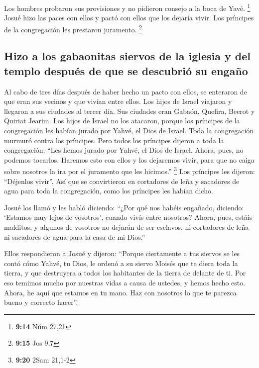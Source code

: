  Los hombres probaron sus provisiones y no pidieron
consejo a la boca de Yavé. \footnote{\textbf{9:14} Núm 27,21}
 Josué hizo las paces con ellos y pactó con ellos que los
dejaría vivir. Los príncipes de la congregación les prestaron juramento.
\footnote{\textbf{9:15} Jos 9,7}

\hypertarget{hizo-a-los-gabaonitas-siervos-de-la-iglesia-y-del-templo-despuuxe9s-de-que-se-descubriuxf3-su-engauxf1o}{%
\subsection{Hizo a los gabaonitas siervos de la iglesia y del templo
después de que se descubrió su
engaño}\label{hizo-a-los-gabaonitas-siervos-de-la-iglesia-y-del-templo-despuuxe9s-de-que-se-descubriuxf3-su-engauxf1o}}

 Al cabo de tres días después de haber hecho un pacto con
ellos, se enteraron de que eran sus vecinos y que vivían entre ellos.
 Los hijos de Israel viajaron y llegaron a sus ciudades
al tercer día. Sus ciudades eran Gabaón, Quefira, Beerot y Quiriat
Jearim.  Los hijos de Israel no los atacaron, porque los
príncipes de la congregación les habían jurado por Yahvé, el Dios de
Israel. Toda la congregación murmuró contra los príncipes.
 Pero todos los príncipes dijeron a toda la congregación:
``Les hemos jurado por Yahvé, el Dios de Israel. Ahora, pues, no podemos
tocarlos.  Haremos esto con ellos y los dejaremos vivir,
para que no caiga sobre nosotros la ira por el juramento que les
hicimos.'' \footnote{\textbf{9:20} 2Sam 21,1-2}  Los
príncipes les dijeron: ``Déjenlos vivir''. Así que se convirtieron en
cortadores de leña y sacadores de agua para toda la congregación, como
los príncipes les habían dicho.

 Josué los llamó y les habló diciendo: ``¿Por qué nos
habéis engañado, diciendo: `Estamos muy lejos de vosotros', cuando vivís
entre nosotros?  Ahora, pues, estáis malditos, y algunos
de vosotros no dejarán de ser esclavos, ni cortadores de leña ni
sacadores de agua para la casa de mi Dios.''

 Ellos respondieron a Josué y dijeron: ``Porque
ciertamente a tus siervos se les contó cómo Yahvé, tu Dios, le ordenó a
su siervo Moisés que te diera toda la tierra, y que destruyera a todos
los habitantes de la tierra de delante de ti. Por eso temimos mucho por
nuestras vidas a causa de ustedes, y hemos hecho esto. 
Ahora, he aquí que estamos en tu mano. Haz con nosotros lo que te
parezca bueno y correcto hacer''.

